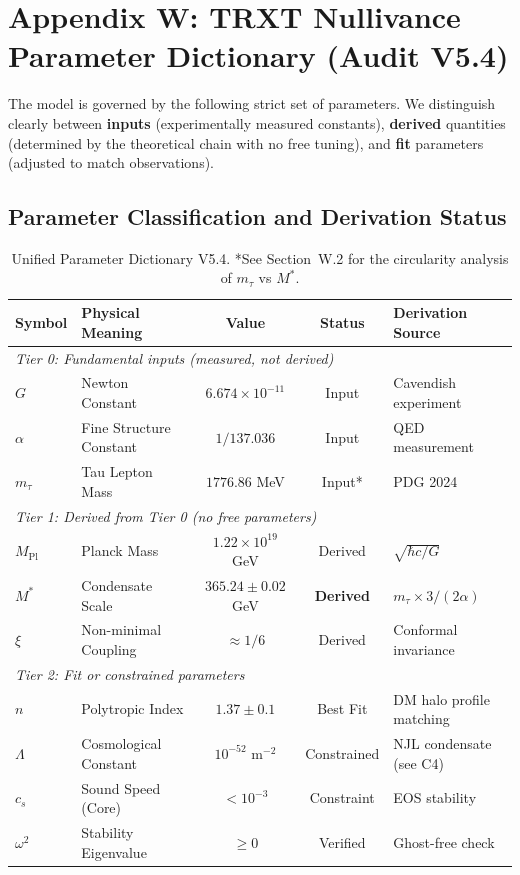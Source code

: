 \section{Appendix W: TRXT Nullivance Parameter Dictionary (Audit V5.4)}
\label{app:dictionary}

The model is governed by the following strict set of parameters.  We distinguish clearly between \textbf{inputs} (experimentally measured constants), \textbf{derived} quantities (determined by the theoretical chain with no free tuning), and \textbf{fit} parameters (adjusted to match observations).

\subsection{Parameter Classification and Derivation Status}

\begin{table}[H]
\centering
\small
\begin{tabular}{llccl}
\toprule
\textbf{Symbol} & \textbf{Physical Meaning} & \textbf{Value} & \textbf{Status} & \textbf{Derivation Source} \\
\midrule
\multicolumn{5}{l}{\textit{Tier 0: Fundamental inputs (measured, not derived)}} \\
$G$ & Newton Constant & $6.674 \times 10^{-11}$ & Input & Cavendish experiment \\
$\alpha$ & Fine Structure Constant & $1/137.036$ & Input & QED measurement \\
$m_\tau$ & Tau Lepton Mass & $1776.86$ MeV & Input* & PDG 2024 \\
\midrule
\multicolumn{5}{l}{\textit{Tier 1: Derived from Tier 0 (no free parameters)}} \\
$M_{\mathrm{Pl}}$ & Planck Mass & $1.22 \times 10^{19}$ GeV & Derived & $\sqrt{\hbar c / G}$ \\
$M^*$ & Condensate Scale & $365.24 \pm 0.02$ GeV & \textbf{Derived} & $m_\tau \times 3/(2\alpha)$ \\
$\xi$ & Non-minimal Coupling & $\approx 1/6$ & Derived & Conformal invariance \\
\midrule
\multicolumn{5}{l}{\textit{Tier 2: Fit or constrained parameters}} \\
$n$ & Polytropic Index & $1.37 \pm 0.1$ & Best Fit & DM halo profile matching \\
$\Lambda$ & Cosmological Constant & $10^{-52} \text{ m}^{-2}$ & Constrained & NJL condensate (see C4) \\
$c_s$ & Sound Speed (Core) & $< 10^{-3}$ & Constraint & EOS stability \\
$\omega^2$ & Stability Eigenvalue & $\ge 0$ & Verified & Ghost-free check \\
\bottomrule
\end{tabular}
\caption{Unified Parameter Dictionary V5.4.  *See Section~W.2 for the circularity analysis of $m_\tau$ vs $M^*$.}
\label{tab:params}
\end{table}

